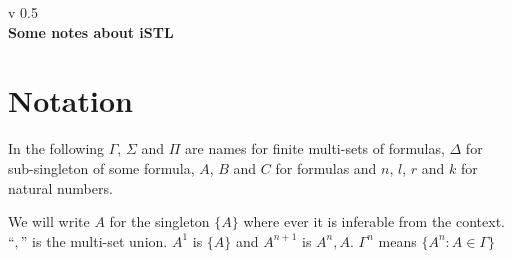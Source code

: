 \documentclass[a4paper, 12pt]{paper}
\begin{document}
{\noindent
	v 0.5 \\
{\large\textbf{Some notes about iSTL}}
}
\\
\setcounter{section}{-1}
\section{Notation} In the following $\Gamma$, $\Sigma$ and $\Pi$ are names for finite multi-sets of formulas, $\Delta$ for sub-singleton of some formula, $A$, $B$ and $C$ for formulas and $n$, $l$, $r$ and $k$ for natural numbers.

We will write $A$ for the singleton $\{A\}$ where ever it is inferable from the context.
``$,$'' is the multi-set union.
$A^1$ is $\{A\}$ and $A^{n+1}$ is $A^n, A$. $\Gamma^n$ means $\{ A^n : A \in \Gamma \}$









\end{document}
